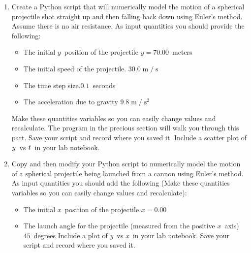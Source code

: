 \documentclass[twoside,11pt,ShortChapTitles]{BYUTextbook}
\begin{document}
\begin{enumerate}
\item {\small Create a Python script that will numerically model the motion of
a spherical projectile shot straight up and then falling back down using
Euler's method. Assume there is no air resistance. As input quantities you
should provide the following:}

\begin{itemize}
\item {\small The initial }$y${\small \ position of the projectile } $y=70.00${\small \ meters}

\item {\small The initial speed of the projectile. }$30.0 \operatorname{m} / \operatorname{s} $

\item {\small The time step size.}$0.1${\small \ seconds}

\item {\small The acceleration due to gravity }$9.8 \operatorname{m} / \operatorname{s} ^{2}$
\end{itemize}

{\small Make these quantities variables so you can easily change values and
recalculate. The program in the precious section will walk you through this part. Save your script and record where you saved it.
Include a scatter plot of }${\small y}${\small \ vs }${\small t}${\small \ in
your lab notebook.}

\item {\small Copy and then modify your Python script to numerically model the
motion of a spherical projectile being launched from a cannon using Euler's
method. As input quantities you should add the following (Make these
quantities variables so you can easily change values and recalculate):}

\begin{itemize}
\item {\small The initial }$x${\small \ position of the projectile }$x=0.00$

\item {\small The launch angle for the projectile (measured from the positive
}$x${\small \ axis) }$45${\small \ degrees Include a plot of }$y${\small \ vs
}$x${\small \ in your lab notebook. Save your script and record where you
saved it.}
\end{itemize}


\end{enumerate}
\end{document}
